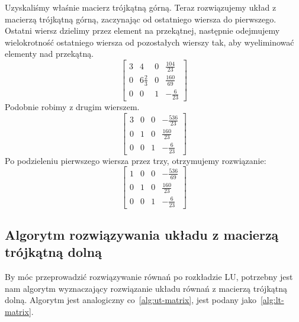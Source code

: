 \documentclass[../main.tex]{subfiles}
\begin{document}
\begin{example}
      Uzyskaliśmy właśnie macierz trójkątną górną. Teraz rozwiązujemy
      układ z macierzą trójkątną górną, zaczynając od ostatniego wiersza do
      pierwszego. Ostatni wiersz dzielimy przez element na przekątnej,
      następnie odejmujemy wielokrotność ostatniego wiersza od pozostałych
      wierszy tak, aby wyeliminować elementy nad przekątną.
      \begin{equation*}
        \left[ \begin{array}{ccc|c}
          3 & 4             & 0             & \frac{104}{23}   \\
          0 & 6\frac{2}{3}  & 0             & \frac{160}{69}   \\
          0 & 0             & 1             & -\frac{6}{23}
        \end{array}\right]
      \end{equation*}
      Podobnie robimy z drugim wierszem. 
      \begin{equation*}
        \left[ \begin{array}{ccc|c}
          3 & 0             & 0             & -\frac{536}{23}  \\
          0 & 1             & 0             & \frac{160}{23}   \\
          0 & 0             & 1             & -\frac{6}{23}
        \end{array}\right]
      \end{equation*}
      Po podzieleniu pierwszego wiersza przez trzy, otrzymujemy rozwiązanie:
      \begin{equation*}
        \left[ \begin{array}{ccc|c}
          1 & 0             & 0             & -\frac{536}{69}  \\
          0 & 1             & 0             & \frac{160}{23}   \\
          0 & 0             & 1             & -\frac{6}{23}
        \end{array}\right]
      \end{equation*}
    \end{example}

    \subsection{Algorytm rozwiązywania układu z macierzą trójkątną dolną}

    By móc przeprowadzić rozwiązywanie równań po rozkładzie LU, potrzebny
    jest nam algorytm wyznaczający rozwiązanie układu równań z macierzą
    trójkątną dolną. Algorytm jest analogiczny co~\ref{alg:ut-matrix},
    jest podany jako~\ref{alg:lt-matrix}.
\end{document}
